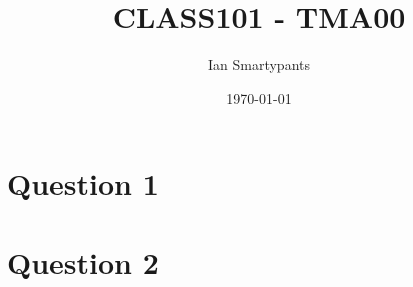 \documentclass[12pt]{article}
\title{CLASS101 - TMA00}
\author{Ian Smartypants}
\date{\today}
\begin{document}
\maketitle

\section*{Question 1}


\section*{Question 2}

\end{document}
